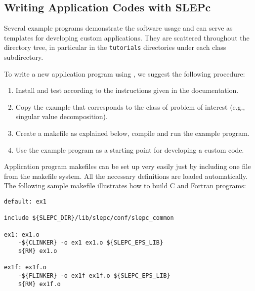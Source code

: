 \subsection{Writing Application Codes with SLEPc}

Several example programs demonstrate the software usage and can serve as templates for developing custom applications. They are scattered throughout the \slepc directory tree, in particular in the \Verb!tutorials! directories under each class subdirectory.

To write a new application program using \slepc, we suggest the following procedure:
\begin{enumerate}
\item Install and test \slepc according to the instructions given in the documentation.
\item Copy the \slepc example that corresponds to the class of problem of interest (e.g., singular value decomposition).
\item Create a makefile as explained below, compile and run the example program.
\item Use the example program as a starting point for developing a custom code.
\end{enumerate}

	Application program makefiles can be set up very easily just by including one file from the \slepc makefile system. All the necessary \petsc{} definitions are loaded automatically. The following sample makefile illustrates how to build C and Fortran programs:

	\begin{Verbatim}[fontsize=\small]
default: ex1

include ${SLEPC_DIR}/lib/slepc/conf/slepc_common

ex1: ex1.o
	-${CLINKER} -o ex1 ex1.o ${SLEPC_EPS_LIB}
	${RM} ex1.o

ex1f: ex1f.o
	-${FLINKER} -o ex1f ex1f.o ${SLEPC_EPS_LIB}
	${RM} ex1f.o
	\end{Verbatim}

